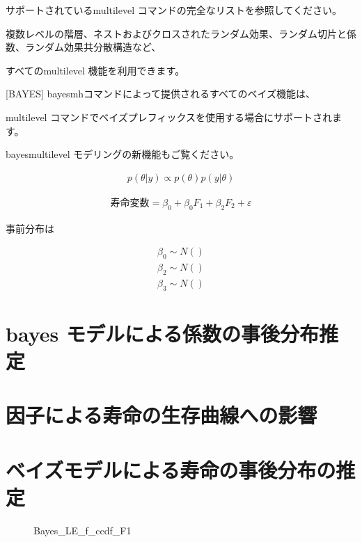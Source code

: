 \documentclass[a4j,11pt,mc]{jreport}
\begin{document}
	サポートされているmultilevel コマンドの完全なリストを参照してください。

	複数レベルの階層、ネストおよびクロスされたランダム効果、ランダム切片と係数、ランダム効果共分散構造など、

	すべてのmultilevel 機能を利用できます。


	 [BAYES] bayesmhコマンドによって提供されるすべてのベイズ機能は、

	 multilevel コマンドでベイズプレフィックスを使用する場合にサポートされます。

	bayesmultilevel モデリングの新機能もご覧ください。


\begin{eqnarray}
   p(\theta|y) \propto p(\theta)p(y|\theta)
\end{eqnarray}



\begin{eqnarray}
\mbox{寿命変数}=\beta_0 +\beta_0F_1 + \beta_2 F_2+\varepsilon
\end{eqnarray}

事前分布は

\begin{eqnarray}
\beta_0 \sim N()\\
\beta_2 \sim N()\\
\beta_3 \sim N()
\end{eqnarray}





\section{bayes モデルによる係数の事後分布推定}




\section{因子による寿命の生存曲線への影響}

\section{ベイズモデルによる寿命の事後分布の推定}
	\begin{figure}[H]
		\begin{center}
				\caption{Bayes\_LE\_f\_ccdf\_F1}
		\end{center}
	\end{figure}
\end{document}
